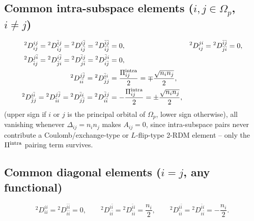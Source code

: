 \documentclass[11pt,a4paper]{article}
\newcommand{\Dtwo}{{}^2D}
\newcommand{\PiMat}{\Pi}
\newcommand{\Om}{\Omega}
\begin{document}
\subsection*{Common intra-subspace elements ($i,j\in\Om_p$, $i\neq j$)}
\begin{align}
\Dtwo^{ij}_{ij}=\Dtwo^{\bar ij}_{\bar ij}=\Dtwo^{i\bar j}_{i\bar j}
=\Dtwo^{\bar i\bar j}_{\bar i\bar j}&=0, &
\Dtwo^{ji}_{ij}=\Dtwo^{\bar i\bar j}_{\bar j\bar i}&=0,
\label{eq:intra-coulomb}\\
\Dtwo^{j\bar i}_{\bar ij}=\Dtwo^{i\bar j}_{\bar ji}
=\Dtwo^{\bar ij}_{j\bar i}=\Dtwo^{\bar ji}_{i\bar j}&=0,
\label{eq:intra-lflip}\\
\Dtwo^{j\bar j}_{i\bar i}=\Dtwo^{\bar ii}_{\bar jj}
&=\frac{\PiMat^{\rm intra}_{ij}}{2}
=\mp\frac{\sqrt{n_in_j}}{2},
\label{eq:intra-piK}\\
\Dtwo^{i\bar i}_{\bar jj}=\Dtwo^{j\bar j}_{\bar ii}
=\Dtwo^{\bar ii}_{j\bar j}=\Dtwo^{\bar jj}_{i\bar i}
&=-\frac{\PiMat^{\rm intra}_{ij}}{2}
=\pm\frac{\sqrt{n_in_j}}{2},
\label{eq:intra-piL}
\end{align}
(upper sign if $i$ or $j$ is the principal orbital of $\Om_p$, lower
sign otherwise), all vanishing whenever $\Delta_{ij}=n_in_j$ makes
$A_{ij}=0$, since intra-subspace pairs never contribute a
Coulomb/exchange-type or $L$-flip-type 2-RDM element -- only the
$\PiMat^{\rm intra}$ pairing term survives.

\subsection*{Common diagonal elements ($i=j$, any functional)}
\begin{equation}
\Dtwo^{ii}_{ii}=\Dtwo^{\bar i\bar i}_{\bar i\bar i}=0,\qquad
\Dtwo^{i\bar i}_{i\bar i}=\Dtwo^{\bar ii}_{\bar ii}=\frac{n_i}{2},\qquad
\Dtwo^{i\bar i}_{\bar ii}=\Dtwo^{\bar ii}_{i\bar i}=-\frac{n_i}{2}.
\label{eq:diag-common}
\end{equation}
\end{document}

